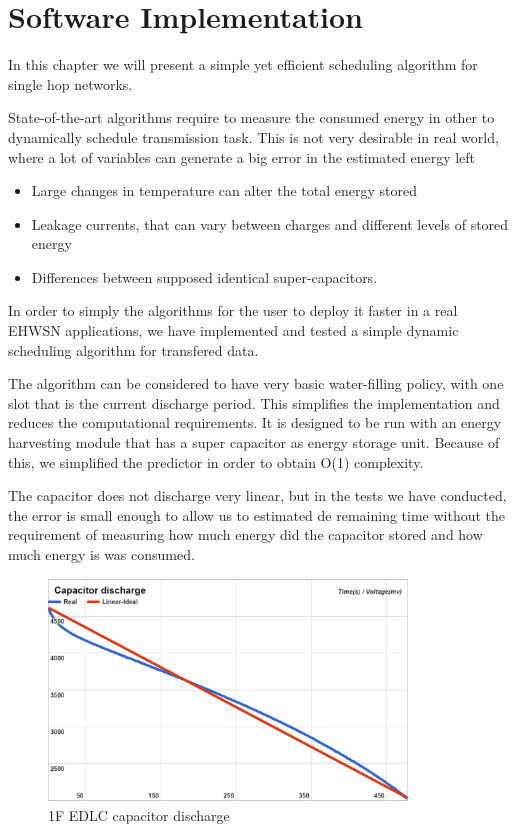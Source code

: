 \normalfont\normalsize
\chapter{Software Implementation}

In this chapter we will present a simple yet efficient scheduling algorithm for single hop networks.

State-of-the-art algorithms require to measure the consumed energy in other to dynamically schedule transmission
task. This is not very desirable in real world, where a lot of variables can generate a big error in the estimated energy left

\begin{itemize}
    \item Large changes in temperature can alter the total energy stored
    \item Leakage currents, that can vary between charges and different levels of stored energy
    \item Differences between supposed identical super-capacitors.
\end{itemize}

In order to simply the algorithms for the user to deploy it faster in a real EHWSN applications,
we have implemented and tested a simple dynamic scheduling algorithm for transfered data.

The algorithm can be considered to have very basic water-filling policy, with one slot that is
the current discharge period. This simplifies the implementation and reduces the computational
requirements. It is designed to be run with an energy harvesting module that has a super capacitor
as energy storage unit. Because of this, we simplified the predictor in order to obtain O(1)
complexity.

The capacitor does not discharge very linear, but in the tests we have conducted, the error is
small enough to allow us to estimated de remaining time without the requirement of measuring how
much energy did the capacitor stored and how much energy is was consumed.

\begin{figure}[ht] \centering
\includegraphics[width=0.85\textwidth]{img/capacitor.png}
\caption{1F EDLC capacitor discharge}
\end{figure}


